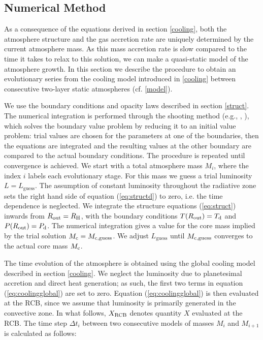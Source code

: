 \documentclass[apj]{emulateapj}
\newcommand{\cb}{_{\rm RCB}}
\begin{document}
\subsection{Numerical Method}
\label{twolayer}


As a consequence of the equations derived in section \ref{cooling}, both the atmosphere structure and the gas accretion rate are uniquely determined by the current atmosphere mass. As this mass accretion rate is slow compared to the time it takes to relax to this solution, we can make a quasi-static model of the atmosphere growth. In this section we describe the procedure to obtain an evolutionary series from the cooling model introduced in \ref{cooling} between consecutive two-layer static atmospheres (cf. \ref{model}).

We use the boundary conditions and opacity laws described in section \ref{struct}. The numerical integration is performed through the shooting method (e.g., \citealt{kippenhahn90}, \citealt{press92}), which solves the boundary value problem by reducing it to an initial value problem: trial values are chosen for the parameters at one of the boundaries, then the equations are integrated and the resulting values at the other boundary are compared to the actual boundary conditions. The procedure is repeated until convergence is achieved. We start with a total atmosphere mass $M_i$, where the index $i$ labels each evolutionary stage. For this mass we guess a trial luminosity $L=L_{\mathrm{guess}}$. The assumption of constant luminosity throughout the radiative zone sets the right hand side of equation (\ref{eq:structd}) to zero, i.e. the time dependence is neglected. We integrate the structure equations (\ref{eq:struct}) inwards from $R_{\mathrm{out}}=R_{\rm H}$, with the boundary conditions $T(R_{\mathrm{out}})=T_{\rm d}$ and $P(R_{\mathrm{out}})=P_{\rm d}$. The numerical integration gives a value for the core mass implied by the trial solution $M_{\rm c}=M_{\rm{c, guess}}$. We adjust $L_{\mathrm{guess}}$ until $M_{\rm{c,guess}}$ converges to the actual core mass $M_{\rm c}$. 

The time evolution of the atmosphere is obtained using the global cooling model described in section \ref{cooling}. We neglect the luminosity due to planetesimal accretion and direct heat generation; as such, the first two terms in equation (\ref{eq:coolingglobal}) are set to zero. Equation (\ref{eq:coolingglobal}) is then evaluated at the RCB, since we assume that luminosity is primarily generated in the convective zone. In what follows, $X\cb$ denotes quantity $X$ evaluated at the RCB. The time step $\Delta t_i$ between two consecutive models of masses $M_i$ and $M_{i+1}$ is calculated as follows:
\end{document}

